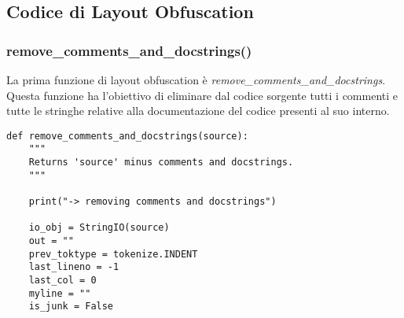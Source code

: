 \documentclass[a4paper,oneside,openright,titlepage,10pt,footinclude,headinclude]{scrbook}
\begin{document}
\subsection{Codice di Layout Obfuscation}

\subsubsection{remove\_comments\_and\_docstrings()}

La prima funzione di layout obfuscation è \emph{remove\_comments\_and\_docstrings}.
Questa funzione ha l'obiettivo di eliminare dal codice sorgente tutti i commenti  e tutte le stringhe relative alla documentazione del codice presenti al suo interno.
\begin{graybox}[innerleftmargin=2,]
\begin{lstlisting}
def remove_comments_and_docstrings(source):
    """
    Returns 'source' minus comments and docstrings.
    """

    print("-> removing comments and docstrings")

    io_obj = StringIO(source)
    out = ""
    prev_toktype = tokenize.INDENT
    last_lineno = -1
    last_col = 0
    myline = ""
    is_junk = False


\end{lstlisting}
\end{graybox}
\end{document}

